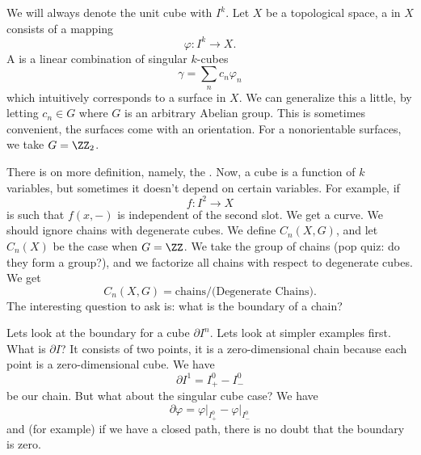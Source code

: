 We will always denote the unit cube with $I^k$. Let $X$ be a
topological space, a  in $X$ consists of a
mapping
\begin{equation}
\varphi\colon I^k\to X.
\end{equation}
A  is 
a linear combination of singular $k$-cubes
\begin{equation}
\gamma=\sum_{n}c_{n}\varphi_{n}
\end{equation}
which intuitively corresponds to a surface in $X$.
We can generalize this a little, by letting $c_n\in G$ where $G$
is an arbitrary Abelian group. This is sometimes convenient, the
surfaces come with an orientation. 
For a nonorientable surfaces, we
take $G=\ZZ_2$.

There is on more definition, namely, the .
Now, a cube is a function of $k$ variables, but sometimes it
doesn't depend on certain variables. For example, if 
\begin{equation}
f\colon I^2\to X
\end{equation}
is such that $f(x,-)$ is independent of the second slot. We get a
curve. We should ignore chains with degenerate cubes.
We define $C_{n}(X,G)$,
and let $C_{n}(X)$ be the case when $G=\ZZ$. We take the group of
chains (pop quiz: do they form a group?), and we factorize all
chains with respect to degenerate cubes. We get
\begin{equation}
C_{n}(X,G) = \mbox{chains}/\mbox{(Degenerate Chains)}.
\end{equation}
The interesting question to ask is: what is the
boundary of a chain?

Lets look at the boundary for a cube $\partial I^n$. Lets look at simpler examples
first. What is $\partial I$? It consists of two points, it is a
zero-dimensional chain because each point is a zero-dimensional
cube. We have
\begin{equation}
\partial I^1=I^{0}_{+}-I^{0}_{-}
\end{equation}
be our chain. But what about the singular cube case? We have
\begin{equation}
\partial\varphi=\left.\varphi\right|_{I^{0}_{+}}
-\left.\varphi\right|_{I^{0}_{-}}
\end{equation}
and (for example) if we have a closed path, there is no doubt
that the boundary is zero.

